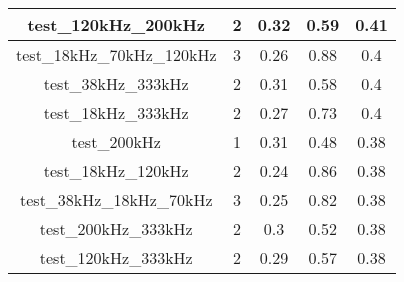 \begin{longtable}{|c|c|c|c|c|}
test\_120kHz\_200kHz                              & 2                                                                                              & 0.32                                    & 0.59                                 & 0.41                                    \\ \hline
test\_18kHz\_70kHz\_120kHz                        & 3                                                                                              & 0.26                                    & 0.88                                 & 0.4                                     \\ \hline
test\_38kHz\_333kHz                               & 2                                                                                              & 0.31                                    & 0.58                                 & 0.4                                     \\ \hline
test\_18kHz\_333kHz                               & 2                                                                                              & 0.27                                    & 0.73                                 & 0.4                                     \\ \hline
test\_200kHz                                      & 1                                                                                              & 0.31                                    & 0.48                                 & 0.38                                    \\ \hline
test\_18kHz\_120kHz                               & 2                                                                                              & 0.24                                    & 0.86                                 & 0.38                                    \\ \hline
test\_38kHz\_18kHz\_70kHz                         & 3                                                                                              & 0.25                                    & 0.82                                 & 0.38                                    \\ \hline
test\_200kHz\_333kHz                              & 2                                                                                              & 0.3                                     & 0.52                                 & 0.38                                    \\ \hline
test\_120kHz\_333kHz                              & 2                                                                                              & 0.29                                    & 0.57                                 & 0.38                                    \\ \hline

\end{longtable}
